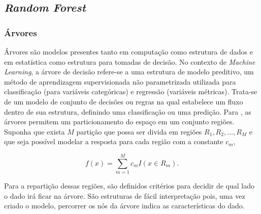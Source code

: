 \subsection{\emph{Random Forest}}


\subsubsection{Árvores}

Árvores são modelos presentes tanto em computação como estrutura de dados e em estatística como estrutura para tomadas de decisão. No contexto de \emph{Machine Learning}, a árvore de decisão refere-se a uma estrutura de modelo preditivo, um método de aprendizagem supervisionada não parametrizada utilizada para classificação (para variáveis categóricas) e regressão (variáveis métricas). Trata-se de um modelo de conjunto de decisões ou regras na qual estabelece um fluxo dentro de sua estrutura, definindo uma classificação ou uma predição. Para , as árvores permitem um particionamento do espaço em um conjunto regiões. Suponha que exista \begin{math}M\end{math} partição que possa ser divida em regiões \begin{math}R_{1}, R_{2}, ..., R_{M} \end{math} e que seja possível modelar a resposta para cada região com a constante \begin{math}c_{m}\end{math}, 

\begin{equation}
f(x) = \sum_{m=1}^{M}c_{m}I( x \in R_{m} ) .
\end{equation}

Para a repartição dessas regiões, são definidos critérios para decidir de qual lado o dado irá ficar na árvore. São estruturas de fácil interpretação pois, uma vez criado o modelo, percorrer os nós da árvore indica as características do dado.



